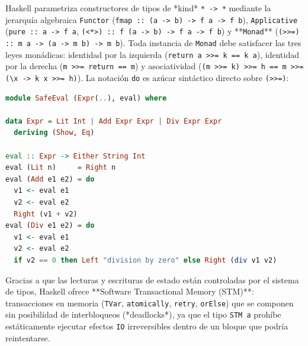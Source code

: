 \documentclass{book}
\begin{document}
Haskell parametriza constructores de tipos de *kind* \texttt{* -> *} mediante la jerarquía algebraica \texttt{Functor} (\texttt{fmap :: (a -> b) -> f a -> f b}), \texttt{Applicative} (\texttt{pure :: a -> f a}, \texttt{(<*>) :: f (a -> b) -> f a -> f b}) y **\texttt{Monad}** (\texttt{(>>=) :: m a -> (a -> m b) -> m b}). Toda instancia de \texttt{Monad} debe satisfacer las tres leyes monádicas: identidad por la izquierda (\texttt{return a >>= k == k a}), identidad por la derecha (\texttt{m >>= return == m}) y asociatividad (\texttt{(m >>= k) >>= h == m >>= (\textbackslash{}x -> k x >>= h)}). La notación \texttt{do} es azúcar sintáctico directo sobre \texttt{(>>=)}:
\begin{lstlisting}[style=studium,language={Haskell}]
module SafeEval (Expr(..), eval) where

data Expr = Lit Int | Add Expr Expr | Div Expr Expr
  deriving (Show, Eq)

eval :: Expr -> Either String Int
eval (Lit n)     = Right n
eval (Add e1 e2) = do
  v1 <- eval e1
  v2 <- eval e2
  Right (v1 + v2)
eval (Div e1 e2) = do
  v1 <- eval e1
  v2 <- eval e2
  if v2 == 0 then Left "division by zero" else Right (div v1 v2)
\end{lstlisting}
Gracias a que las lecturas y escrituras de estado están controladas por el sistema de tipos, Haskell ofrece **Software Transactional Memory (STM)**: transacciones en memoria (\texttt{TVar}, \texttt{atomically}, \texttt{retry}, \texttt{orElse}) que se componen sin posibilidad de interbloqueos (*deadlocks*), ya que el tipo \texttt{STM a} prohíbe estáticamente ejecutar efectos \texttt{IO} irreversibles dentro de un bloque que podría reintentarse.
\end{document}
